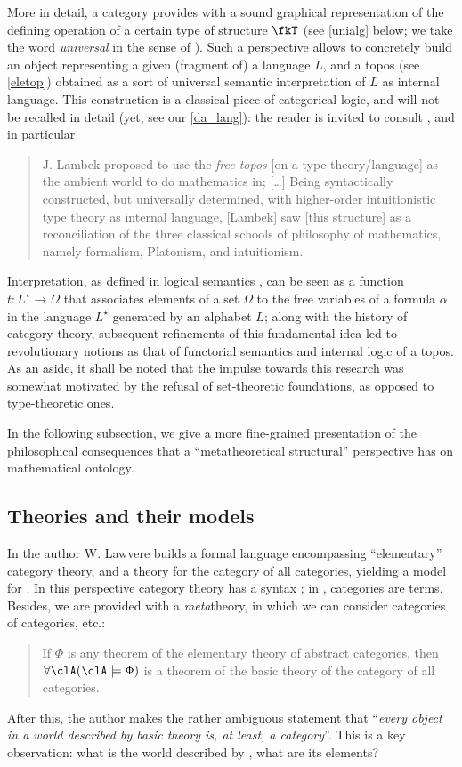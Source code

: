 More in detail, a category provides with a sound graphical representation of the defining operation of a certain type of structure $\fkT$ (see \autoref{unialg} below; we take the word \emph{universal} in the sense of \cite[XV.1]{grillet2007abstract}).
Such a perspective allows to concretely build an object representing a given
(fragment of) a language $L$, and a topos (see \autoref{eletop}) obtained as a sort of universal semantic interpretation of $L$ as internal language. This construction is a classical piece of categorical logic, and will not be recalled in detail (yet, see our \autoref{da_lang}): the reader is invited to consult \cite[II.12, 13, 14]{lambek1988introduction}, and in particular
\begin{quote}
    J. Lambek proposed to use the \emph{free topos} [on a type theory/language] as the ambient world to do mathematics in; [\dots\unkern] Being syntactically constructed, but universally determined, with higher-order intuitionistic type theory as internal language, [Lambek] saw [this structure] as a reconciliation of the three classical schools of philosophy of mathematics, namely formalism, Platonism, and intuitionism. \hfill\cite{free_topos}
\end{quote}
Interpretation, as defined in logical semantics \cite{gamut1991logic}, can be seen as a function $t: L^\star \to \Omega$ that associates elements of a set $\Omega$ to the free variables of a formula $\alpha$ in the language $L^\star$ generated by an alphabet $L$; along with the history of category theory, subsequent refinements of this fundamental idea led to revolutionary notions as that of functorial semantics and internal logic of a topos.
As an aside, it shall be noted that the impulse towards this research was somewhat motivated by the refusal of set-theoretic foundations, as opposed to type-theoretic ones.

In the following subsection, we give a more fine-grained presentation of the philosophical consequences that a ``metatheoretical structural'' perspective has on mathematical ontology.
\subsection{Theories and their models}
In \cite{lajolla} the author W. Lawvere builds a formal language  encompassing ``elementary'' category theory, and a theory  for the category of all categories, yielding a model for . In this perspective category theory has a syntax \CT; in \CT, categories are terms. Besides, we are provided with a \emph{meta}theory, in which we can consider categories of categories, etc.:
\begin{quote}
    If $\Phi$ is any theorem of the elementary theory of abstract categories, then $\forall \clA (\clA \models \Phi)$ is a theorem of the basic theory of the category of all categories. \hfill \cite{lajolla}
\end{quote}
After this, the author makes the rather ambiguous statement that ``\textit{every object in a world described by basic theory is, at least, a category}''. This is a key observation: what is the world described by , what are its elements?

